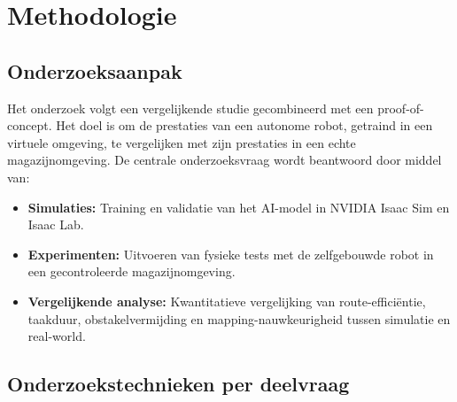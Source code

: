 \section{Methodologie}%
\label{sec:Methodologie}

\subsection{Onderzoeksaanpak}
Het onderzoek volgt een vergelijkende studie gecombineerd met een proof-of-concept. Het doel is om de prestaties van een autonome robot, getraind in een virtuele omgeving, te vergelijken met zijn prestaties in een echte magazijnomgeving. De centrale onderzoeksvraag wordt beantwoord door middel van:
\begin{itemize}
    \item \textbf{Simulaties:} Training en validatie van het AI-model in NVIDIA Isaac Sim en Isaac Lab.
    \item \textbf{Experimenten:} Uitvoeren van fysieke tests met de zelfgebouwde robot in een gecontroleerde magazijnomgeving.
    \item \textbf{Vergelijkende analyse:} Kwantitatieve vergelijking van route-efficiëntie, taakduur, obstakelvermijding en mapping-nauwkeurigheid tussen simulatie en real-world.
\end{itemize}

\subsection{Onderzoekstechnieken per deelvraag}
